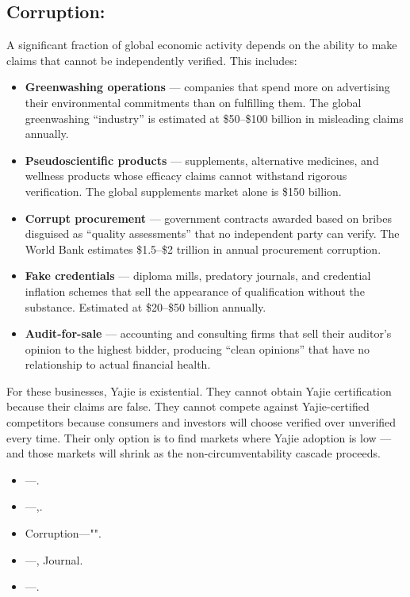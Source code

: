 \documentclass[12pt,a4paper]{article}
\theoremstyle{remark}
\begin{document}
\subsection{Corruption:}
A significant fraction of global economic activity depends on the ability to make claims 
that cannot be independently verified. This includes:
\begin{itemize}[leftmargin=*, itemsep=4pt]
 \item \textbf{Greenwashing operations} --- companies that spend more on advertising their 
 environmental commitments than on fulfilling them. The global greenwashing 
 ``industry'' is estimated at \$50--\$100 billion in misleading claims annually.
 \item \textbf{Pseudoscientific products} --- supplements, alternative medicines, and 
 wellness products whose efficacy claims cannot withstand rigorous verification. 
 The global supplements market alone is \$150 billion.
 \item \textbf{Corrupt procurement} --- government contracts awarded based on bribes 
 disguised as ``quality assessments'' that no independent party can verify. 
 The World Bank estimates \$1.5--\$2 trillion in annual procurement corruption.
 \item \textbf{Fake credentials} --- diploma mills, predatory journals, and credential 
 inflation schemes that sell the appearance of qualification without the substance. 
 Estimated at \$20--\$50 billion annually.
 \item \textbf{Audit-for-sale} --- accounting and consulting firms that sell their 
 auditor's opinion to the highest bidder, producing ``clean opinions'' that have 
 no relationship to actual financial health.
\end{itemize}
For these businesses, Yajie is existential. They cannot obtain Yajie certification because 
their claims are false. They cannot compete against Yajie-certified competitors because 
consumers and investors will choose verified over unverified every time. Their only option 
is to find markets where Yajie adoption is low --- and those markets will shrink as the 
non-circumventability cascade proceeds.
\medskip
\begin{itemize}
 \item ---.
 \item ---,.
 \item Corruption---"".
 \item ---, Journal.
 \item ---.
\end{itemize}
\end{document}

